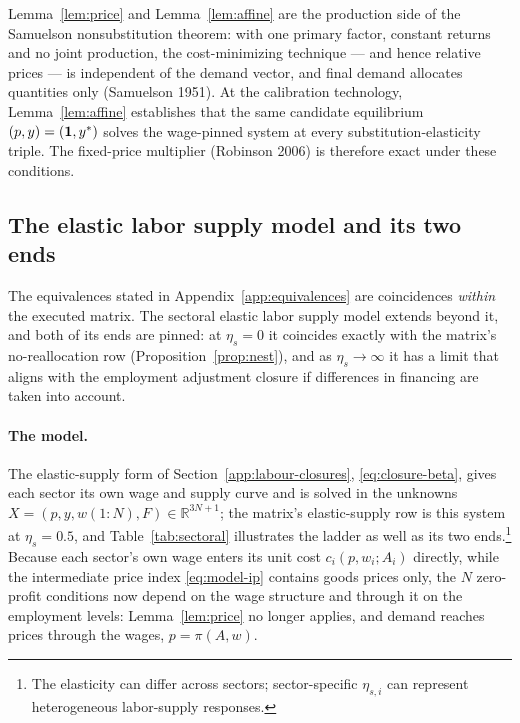 \begin{remark}[Nonsubstitution]\label{rem:samuelson}
Lemma~\ref{lem:price} and Lemma~\ref{lem:affine} are the production side of
the Samuelson nonsubstitution theorem: with one primary factor, constant
returns and no joint production, the cost-minimizing technique --- and hence
relative prices --- is independent of the demand vector, and final demand
allocates quantities only (Samuelson 1951). At the calibration technology,
Lemma~\ref{lem:affine} establishes that the same candidate equilibrium
$(p,y)=(\mathbf{1},y^{\ast})$ solves the wage-pinned system at every substitution-elasticity
triple. The fixed-price multiplier (Robinson 2006) is therefore exact under
these conditions.
\end{remark}

\subsection{The elastic labor supply model and its two ends}\label{app:sectoral}

The equivalences stated in Appendix~\ref{app:equivalences} are coincidences
\emph{within} the executed matrix. The sectoral elastic labor supply model extends beyond it, and
both of its ends are pinned: at $\eta_s=0$ it coincides exactly with the
matrix's no-reallocation row (Proposition~\ref{prop:nest}), and as
$\eta_s\to\infty$ it has a limit that aligns with the employment adjustment closure if differences in financing are taken into account.

\paragraph{The model.} The elastic-supply form of
Section~\ref{app:labour-closures}, \eqref{eq:closure-beta}, gives each sector
its own wage and supply curve and is solved in the unknowns
$X = (p, y, w(1{:}N), F) \in \mathbb{R}^{3N+1}$; the matrix's elastic-supply
row is this system at $\eta_s = 0.5$, and
Table~\ref{tab:sectoral} illustrates the ladder as well as its two ends.\footnote{The elasticity can differ
across sectors; sector-specific $\eta_{s,i}$ can represent heterogeneous
labor-supply responses.} Because
each sector's own wage enters its unit cost $c_i(p,w_i;A_i)$ directly, while the
intermediate price index \eqref{eq:model-ip} contains goods prices only, the $N$
zero-profit conditions now depend on the wage structure and through it on the
employment levels: Lemma~\ref{lem:price} no longer applies, and demand reaches
prices through the wages, $p = \pi(A, w)$.

